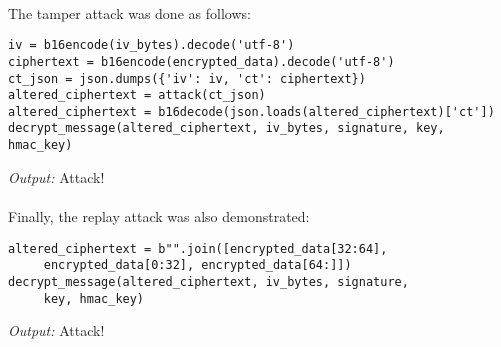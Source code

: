 \paragraph{ }The tamper attack was done as follows:
\begin{lstlisting}
iv = b16encode(iv_bytes).decode('utf-8')
ciphertext = b16encode(encrypted_data).decode('utf-8')
ct_json = json.dumps({'iv': iv, 'ct': ciphertext})
altered_ciphertext = attack(ct_json)
altered_ciphertext = b16decode(json.loads(altered_ciphertext)['ct'])
decrypt_message(altered_ciphertext, iv_bytes, signature, key, hmac_key)
\end{lstlisting}
\textit{Output:} Attack!

\paragraph{ }Finally, the replay attack was also demonstrated:
\begin{lstlisting}
altered_ciphertext = b"".join([encrypted_data[32:64],
	 encrypted_data[0:32], encrypted_data[64:]])
decrypt_message(altered_ciphertext, iv_bytes, signature,
	 key, hmac_key)
\end{lstlisting}
\textit{Output:} Attack!